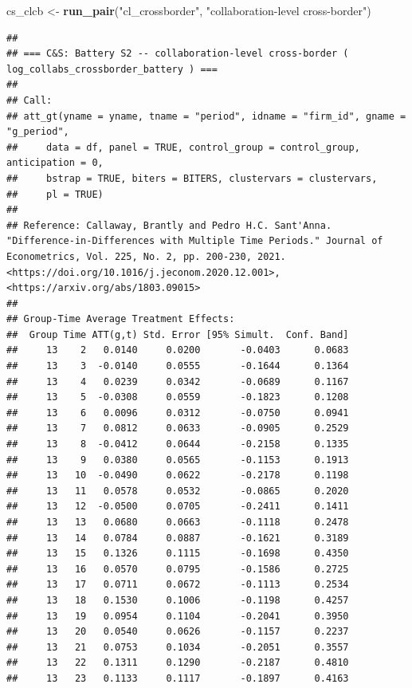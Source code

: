 \documentclass[
]{article}
\newenvironment{Shaded}{\begin{snugshade}}{\end{snugshade}}
\newcommand{\FunctionTok}[1]{\textcolor[rgb]{0.13,0.29,0.53}{\textbf{#1}}}
\newcommand{\NormalTok}[1]{#1}
\newcommand{\OtherTok}[1]{\textcolor[rgb]{0.56,0.35,0.01}{#1}}
\newcommand{\StringTok}[1]{\textcolor[rgb]{0.31,0.60,0.02}{#1}}
\begin{document}
\begin{Shaded}
\begin{Highlighting}[]
\NormalTok{cs\_clcb }\OtherTok{\textless{}{-}} \FunctionTok{run\_pair}\NormalTok{(}\StringTok{"cl\_crossborder"}\NormalTok{,   }\StringTok{"collaboration{-}level cross{-}border"}\NormalTok{)}
\end{Highlighting}
\end{Shaded}

\begin{verbatim}
## 
## === C&S: Battery S2 -- collaboration-level cross-border ( log_collabs_crossborder_battery ) ===
## 
## Call:
## att_gt(yname = yname, tname = "period", idname = "firm_id", gname = "g_period", 
##     data = df, panel = TRUE, control_group = control_group, anticipation = 0, 
##     bstrap = TRUE, biters = BITERS, clustervars = clustervars, 
##     pl = TRUE)
## 
## Reference: Callaway, Brantly and Pedro H.C. Sant'Anna.  "Difference-in-Differences with Multiple Time Periods." Journal of Econometrics, Vol. 225, No. 2, pp. 200-230, 2021. <https://doi.org/10.1016/j.jeconom.2020.12.001>, <https://arxiv.org/abs/1803.09015> 
## 
## Group-Time Average Treatment Effects:
##  Group Time ATT(g,t) Std. Error [95% Simult.  Conf. Band]  
##     13    2   0.0140     0.0200       -0.0403      0.0683  
##     13    3  -0.0140     0.0555       -0.1644      0.1364  
##     13    4   0.0239     0.0342       -0.0689      0.1167  
##     13    5  -0.0308     0.0559       -0.1823      0.1208  
##     13    6   0.0096     0.0312       -0.0750      0.0941  
##     13    7   0.0812     0.0633       -0.0905      0.2529  
##     13    8  -0.0412     0.0644       -0.2158      0.1335  
##     13    9   0.0380     0.0565       -0.1153      0.1913  
##     13   10  -0.0490     0.0622       -0.2178      0.1198  
##     13   11   0.0578     0.0532       -0.0865      0.2020  
##     13   12  -0.0500     0.0705       -0.2411      0.1411  
##     13   13   0.0680     0.0663       -0.1118      0.2478  
##     13   14   0.0784     0.0887       -0.1621      0.3189  
##     13   15   0.1326     0.1115       -0.1698      0.4350  
##     13   16   0.0570     0.0795       -0.1586      0.2725  
##     13   17   0.0711     0.0672       -0.1113      0.2534  
##     13   18   0.1530     0.1006       -0.1198      0.4257  
##     13   19   0.0954     0.1104       -0.2041      0.3950  
##     13   20   0.0540     0.0626       -0.1157      0.2237  
##     13   21   0.0753     0.1034       -0.2051      0.3557  
##     13   22   0.1311     0.1290       -0.2187      0.4810  
##     13   23   0.1133     0.1117       -0.1897      0.4163  

\end{verbatim}
\end{document}
